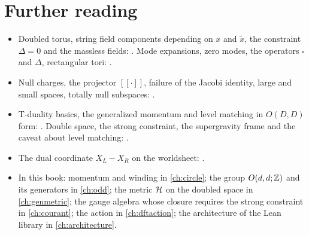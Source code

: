 \section*{Further reading}
\begin{itemize}[leftmargin=*]
\item Doubled torus, string field components depending on $x$ and $\tilde x$, the constraint
 $\Delta=0$ and the massless fields: . Mode expansions, zero modes,
 the operators $\square$ and $\Delta$, rectangular tori: .
\item Null charges, the projector $[[\cdot]]$, failure of the Jacobi identity, large and small
 spaces, totally null subspaces: .
\item T-duality basics, the generalized momentum and level matching in $O(D,D)$ form:
 . Double space, the strong constraint, the supergravity frame
 and the caveat about level matching: .
\item The dual coordinate $X_L-X_R$ on the worldsheet: .
\item In this book: momentum and winding in \cref{ch:circle}; the group $O(d,d;\mathbb{Z})$ and its
 generators in \cref{ch:odd}; the metric $\mathcal{H}$ on the doubled space in \cref{ch:genmetric};
 the gauge algebra whose closure requires the strong constraint in \cref{ch:courant}; the action
 in \cref{ch:dftaction}; the architecture of the Lean library in \cref{ch:architecture}.
\end{itemize}

